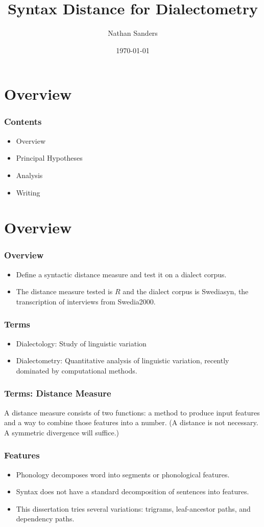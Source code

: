 \documentclass{beamer}
\title{Syntax Distance for Dialectometry}
\author{Nathan Sanders}
\date{\today}
\begin{document}
\frame{\titlepage}
\section{Overview}
\begin{frame}
  \frametitle{Contents}
  \begin{itemize}
  \item Overview
  \item Principal Hypotheses
  \item Analysis
  \item Writing
\end{itemize}
\end{frame}

\section{Overview}
\begin{frame}
  \frametitle{Overview}
  \begin{itemize}
 \item Define a syntactic distance measure and test it on a dialect corpus.
 \item The distance measure tested is $R$ and the dialect corpus is
  Swediasyn, the transcription of interviews from Swedia2000.
  \end{itemize}
\end{frame}

\begin{frame}
  \frametitle{Terms}
  \begin{itemize}
  \item Dialectology: Study of linguistic variation
  \item Dialectometry: Quantitative analysis of linguistic variation,
    recently dominated by computational methods.
 \end{itemize}
\end{frame}

\begin{frame}
  \frametitle{Terms: Distance Measure}
  A distance measure consists of two functions: a method to produce input
  features and a way to combine those features into a number. (A distance
  is not necessary. A symmetric divergence will suffice.)
\end{frame}

\begin{frame}
  \frametitle{Features}
  \begin{itemize}
  \item Phonology decomposes word into segments or phonological features.
  \item Syntax does not have a standard decomposition of sentences into features.
  \item This dissertation tries several variations: trigrams,
    leaf-ancestor paths, and dependency paths.
  \end{itemize}
\end{frame}
\end{document}
